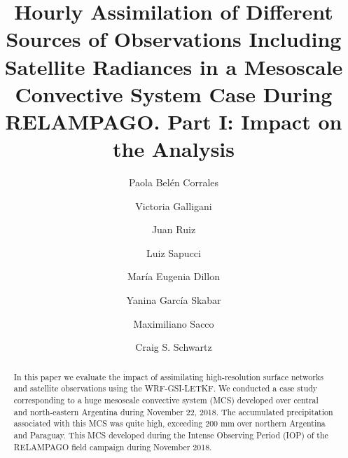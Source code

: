 \documentclass[final,5p,times,twocolumn,authoryear]{elsarticle} %
\begin{document}
\begin{frontmatter}

  \title{Hourly Assimilation of Different Sources of Observations Including Satellite Radiances in a Mesoscale Convective System Case During RELAMPAGO. Part I: Impact on the Analysis}
    \author[UBA,CIMA,CNRS]{Paola Belén Corrales}
    \author[UBA,CIMA,CNRS]{Victoria Galligani}
  
    \author[UBA,CIMA,CNRS]{Juan Ruiz}
  
    \author[INPE]{Luiz Sapucci}
  
    \author[SMN,CONICET]{María Eugenia Dillon}
  
    \author[SMN,CONICET,CNRS]{Yanina García Skabar}
  
    \author[SMN]{Maximiliano Sacco}
  
    \author[NCAR]{Craig S. Schwartz}
  
      \address[UBA]{Universidad de Buenos Aires, Facultad de Ciencias Exactas y Naturales, Departamento de Ciencias de la Atmósfera y los Océanos. Buenos Aires, Argentina.}
    \address[CIMA]{CONICET -- Universidad de Buenos Aires. Centro de Investigaciones del Mar y la Atmósfera (CIMA). Buenos Aires, Argentina.}
    \address[CNRS]{CNRS -- IRD -- CONICET -- UBA. Instituto Franco-Argentino para el Estudio del Clima y sus Impactos (IRL 3351 IFAECI). Buenos Aires, Argentina.}
    \address[SMN]{Servicio Meteorológico Nacional de Argentina.}
    \address[CONICET]{CONICET (Consejo Nacional de Investigaciones Científicas y Técnicas).}
    \address[INPE]{National Institute for Space Research, Brazil, Center for Weather Forecasting and Climate Studies.}
    \address[NCAR]{National Center for Atmospheric Research, Boulder, Colorado.}
  
  \begin{abstract}
  In this paper we evaluate the impact of assimilating high-resolution surface networks and satellite observations using the WRF-GSI-LETKF. We conducted a case study corresponding to a huge mesoscale convective system (MCS) developed over central and north-eastern Argentina during November 22, 2018. The accumulated precipitation associated with this MCS was quite high, exceeding 200 mm over northern Argentina and Paraguay. This MCS developed during the Intense Observing Period (IOP) of the RELAMPAGO field campaign during November 2018.
  

\end{abstract}
\end{frontmatter}
\end{document}
